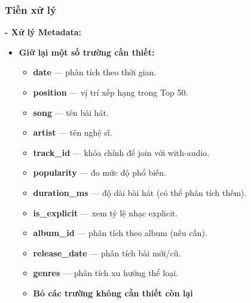 \subsubsection{Tiền xử lý}

\textbf{- Xử lý Metadata:}

\begin{itemize}
    \item \textbf{Giữ lại một số trường cần thiết:}
    \begin{itemize}
        \item \textbf{date} — phân tích theo thời gian.
        \item \textbf{position} — vị trí xếp hạng trong Top 50.
        \item \textbf{song} — tên bài hát.
        \item \textbf{artist} — tên nghệ sĩ.
        \item \textbf{track\_id} — khóa chính để join với with-audio.
        \item \textbf{popularity} — đo mức độ phổ biến.
        \item \textbf{duration\_ms} — độ dài bài hát (có thể phân tích thêm).
        \item \textbf{is\_explicit} — xem tỷ lệ nhạc explicit.
        \item \textbf{album\_id} — phân tích theo album (nếu cần).
        \item \textbf{release\_date} — phân tích bài mới/cũ.
        \item \textbf{genres} — phân tích xu hướng thể loại.
        \item \textbf{Bỏ các trường không cần thiết còn lại}
    \end{itemize}

    
\end{itemize}

